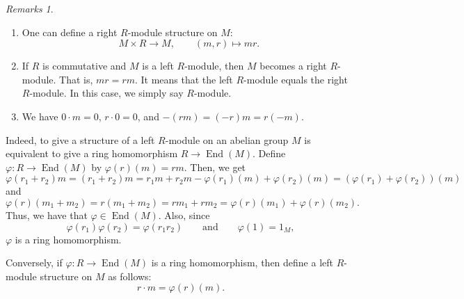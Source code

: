 \documentclass[twoside]{article}
\DeclareMathOperator\End{End}
\newcommand\Z{\mathbb Z}
\theoremstyle{remark}
\newtheorem*{remarks}{{Remarks}}
\newcounter{theorem}
\begin{document}
\begin{remarks}
  \begin{enumerate}
    \item One can define a right \(R\)-module structure on \(M\):
    \[ M \times R \longrightarrow M, \qquad (m,r) \longmapsto mr. \]
    \item If \(R\) is commutative and \(M\) is a left \(R\)-module, then \(M\) becomes a right \(R\)-module. That is, \(mr = rm\). It means that the left \(R\)-module equals the right \(R\)-module. In this case, we simply say \(R\)-module.
    \item We have \(0 \cdot m = 0\), \(r \cdot 0 = 0\), and \(-(rm) = (-r)m = r(-m)\).
  \end{enumerate}
\end{remarks}

\begin{examples}
\end{examples}

Indeed, to give a structure of a left \(R\)-module on an abelian group \(M\) is equivalent to give a ring homomorphism \(R \to \End(M)\). Define \(\varphi\colon R \to \End(M)\) by \(\varphi(r)(m) = rm\). Then, we get
\[ \varphi(r_1+r_2)m = (r_1+r_2)m = r_1m+r_2m - \varphi(r_1)(m) + \varphi(r_2)(m) = (\varphi(r_1)+\varphi(r_2))(m) \]
and
\[ \varphi(r)(m_1+m_2) = r(m_1+m_2) = rm_1+rm_2 = \varphi(r)(m_1) + \varphi(r)(m_2). \]
Thus, we have that \(\varphi \in \End(M)\). Also, since
\[ \varphi(r_1)\varphi(r_2) = \varphi(r_1r_2) \qquad \text{and} \qquad \varphi(1) = 1_M, \]
\(\varphi\) is a ring homomorphism.

Conversely, if \(\varphi\colon R \to \End(M)\) is a ring homomorphism, then define a left \(R\)-module structure on \(M\) as follows:
\[ r \cdot m = \varphi(r)(m). \]

\printindex
\end{document}
